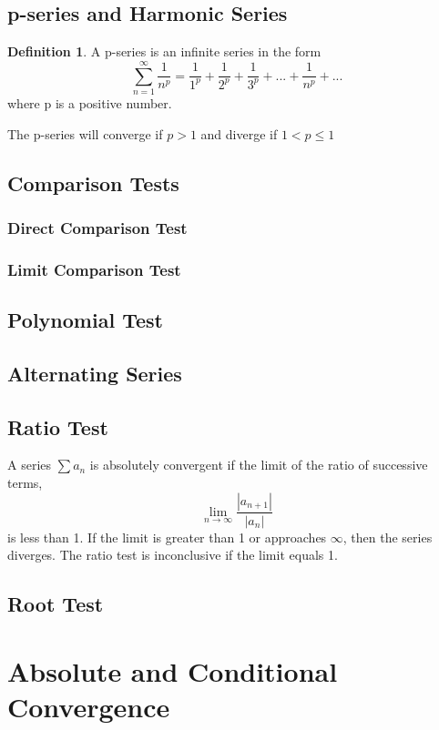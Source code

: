 \documentclass[letterpaper]{report}
\theoremstyle{definition}
\newtheorem{definition}{Definition}
\begin{document}
\subsection{p-series and Harmonic Series}
\begin{definition}
A p-series is an infinite series in the form
\[ \sum_{n=1}^\infty \frac{1}{n^p}=\frac{1}{1^p}+\frac{1}{2^p}
    +\frac{1}{3^p}+...+\frac{1}{n^p}+... \]
where p is a positive number.
\end{definition}
The p-series will converge if $p>1$ and diverge if $1<p\leq1$

\subsection{Comparison Tests}

\subsubsection{Direct Comparison Test}

\subsubsection{Limit Comparison Test}

\subsection{Polynomial Test}

\subsection{Alternating Series}

\subsection{Ratio Test}
A series $\sum{a_n}$ is absolutely convergent if the limit of the ratio
of successive terms,
\[ \lim_{n \rightarrow \infty}\frac{|a_{n+1}|}{|a_n|} \]
is less than 1. If the limit is greater than 1 or approaches $\infty$, then
the series diverges. The ratio test is inconclusive if the limit equals 1.


\subsection{Root Test}

\section{Absolute and Conditional Convergence}
\end{document}
